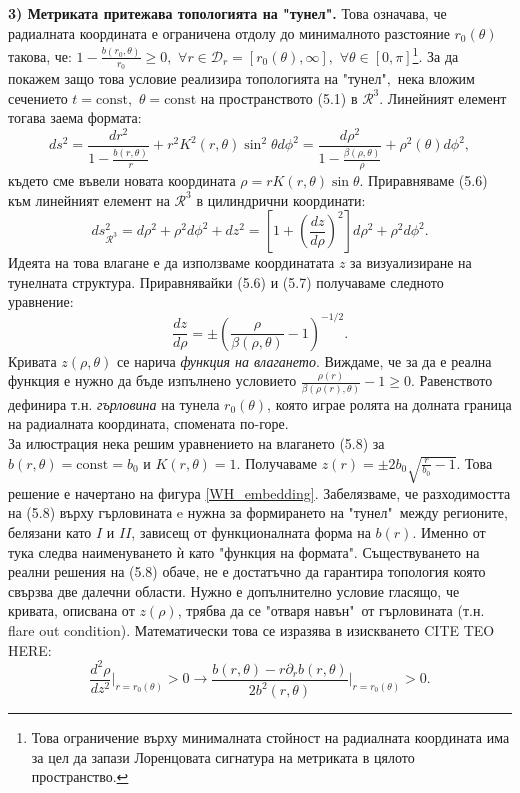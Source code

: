 \noindent\textbf{3) Метриката притежава топологията на "тунел".} Това означава, че радиалната координата е ограничена отдолу до минималното разстояние $r_0(\theta)$ такова, че: $1 - \frac{b(r_0,\theta)}{r_0} \ge 0 ,\,\,\forall r\in \mathcal{D}_r = [r_0(\theta),\infty],\,\,\forall\theta\in[0,\pi]$\footnote{Това ограничение върху минималната стойност на радиалната координата има за цел да запази Лоренцовата сигнатура на метриката в цялото пространство.}. За да покажем защо това условие реализира топологията на "тунел"$,$ нека вложим сечението $t = \text{const},\,\,\theta = \text{const}$ на пространството (5.1) в $\mathcal{R}^3$. Линейният елемент тогава заема формата:
\begin{equation}
	ds^2 = \frac{dr^2}{1 - \frac{b(r,\theta)}{r}} + r^2K^2(r,\theta)\sin^2\theta d\phi^2 = \frac{d\rho^2}{1 - \frac{\beta(\rho,\theta)}{\rho}} + \rho^2(\theta)d\phi^2,
\end{equation}
където сме въвели новата координата $\rho = rK(r,\theta)\sin\theta$. Приравняваме (5.6) към линейният елемент на $\mathcal{R}^3$ в цилиндрични координати:
\begin{equation}
	ds^2_{\mathcal{R}^3} = d\rho^2 + \rho^2d\phi^2 + dz^2 = \left[1 + \left(\frac{dz}{d\rho}\right)^2\right]d\rho^2 + \rho^2d\phi^2.
\end{equation}
Идеята на това влагане е да използваме координатата $z$ за визуализиране на тунелната структура. Приравнявайки (5.6) и (5.7) получаваме следното уравнение:
\begin{equation}
	\frac{dz}{d\rho} = \pm \left(\frac{\rho}{\beta(\rho,\theta)} - 1\right)^{-1/2}.
\end{equation}
Кривата $z(\rho,\theta)$ се нарича \emph{функция на влагането}. Виждаме, че за да е реална функция е нужно да бъде изпълнено условието $\frac{\rho(r)}{\beta(\rho(r),\theta)}-1\ge 0$. Равенството дефинира т.н. \emph{гърловина} на тунела $r_0(\theta)$, която играе ролята на долната граница на радиалната координата, спомената по-горе.\\

\noindent За илюстрация нека решим уравнението на влагането (5.8) за $b(r,\theta) = \text{const} = b_0$ и $K(r,\theta) = 1$. Получаваме $z(r) = \pm 2b_0\sqrt{\frac{r}{b_0} - 1}$. Това решение е начертано на фигура \ref{WH_embedding}. Забелязваме, че разходимостта на (5.8) върху гърловината e нужна за формирането на "тунел"$\,$ между регионите, белязани като $I$ и $II$, зависещ от функционалната форма на $b(r)$. Именно от тука следва наименуването ѝ като "функция на формата". Съществуването на реални решения на (5.8) обаче, не е достатъчно да гарантира топология която свързва две далечни области. Нужно е допълнително условие гласящо, че кривата, описвана от $z(\rho)$, трябва да се "отваря навън"$\,$ от гърловината (т.н. flare out condition). Математически това се изразява в изискването CITE TEO HERE:
\begin{equation}
	\frac{d^2\rho}{dz^2}\bigg\vert_{r = r_0(\theta)} > 0\rightarrow \frac{b(r,\theta) - r\partial_rb(r,\theta)}{2b^2(r,\theta)}\bigg\vert_{r = r_0(\theta)} > 0.
\end{equation}\newline

